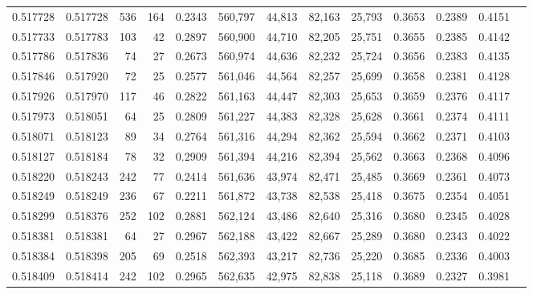 \begin{tabular}{rrrrrrrrrrrrr}
0.517728 & 0.517728 &   536 &   164 &                                     0.2343 & 560,797 &  44,813 &  82,163 &  25,793 & 0.3653 & 0.2389 & 0.4151 \\
0.517733 & 0.517783 &   103 &    42 &                                     0.2897 & 560,900 &  44,710 &  82,205 &  25,751 & 0.3655 & 0.2385 & 0.4142 \\
0.517786 & 0.517836 &    74 &    27 &                                     0.2673 & 560,974 &  44,636 &  82,232 &  25,724 & 0.3656 & 0.2383 & 0.4135 \\
0.517846 & 0.517920 &    72 &    25 &                                     0.2577 & 561,046 &  44,564 &  82,257 &  25,699 & 0.3658 & 0.2381 & 0.4128 \\
0.517926 & 0.517970 &   117 &    46 &                                     0.2822 & 561,163 &  44,447 &  82,303 &  25,653 & 0.3659 & 0.2376 & 0.4117 \\
0.517973 & 0.518051 &    64 &    25 &                                     0.2809 & 561,227 &  44,383 &  82,328 &  25,628 & 0.3661 & 0.2374 & 0.4111 \\
0.518071 & 0.518123 &    89 &    34 &                                     0.2764 & 561,316 &  44,294 &  82,362 &  25,594 & 0.3662 & 0.2371 & 0.4103 \\
0.518127 & 0.518184 &    78 &    32 &                                     0.2909 & 561,394 &  44,216 &  82,394 &  25,562 & 0.3663 & 0.2368 & 0.4096 \\
0.518220 & 0.518243 &   242 &    77 &                                     0.2414 & 561,636 &  43,974 &  82,471 &  25,485 & 0.3669 & 0.2361 & 0.4073 \\
0.518249 & 0.518249 &   236 &    67 &                                     0.2211 & 561,872 &  43,738 &  82,538 &  25,418 & 0.3675 & 0.2354 & 0.4051 \\
0.518299 & 0.518376 &   252 &   102 &                                     0.2881 & 562,124 &  43,486 &  82,640 &  25,316 & 0.3680 & 0.2345 & 0.4028 \\
0.518381 & 0.518381 &    64 &    27 &                                     0.2967 & 562,188 &  43,422 &  82,667 &  25,289 & 0.3680 & 0.2343 & 0.4022 \\
0.518384 & 0.518398 &   205 &    69 &                                     0.2518 & 562,393 &  43,217 &  82,736 &  25,220 & 0.3685 & 0.2336 & 0.4003 \\
0.518409 & 0.518414 &   242 &   102 &                                     0.2965 & 562,635 &  42,975 &  82,838 &  25,118 & 0.3689 & 0.2327 & 0.3981 \\

\end{tabular}
